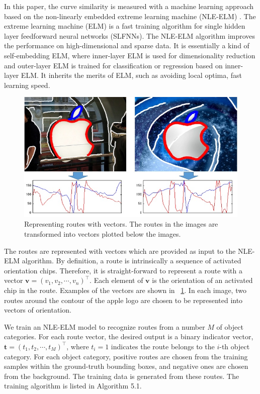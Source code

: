 \documentclass[journal]{IEEEtran}
\begin{document}
In this paper, the curve similarity is measured with a machine learning approach based on 
the non-linearly embedded extreme learning machine (NLE-ELM) \cite{liu2015}.
The extreme learning machine (ELM) \cite{huang2006,tang2015,mohammed2011,huang2014}
is a fast training algorithm for single hidden layer feedforward neural networks (SLFNNs).
The NLE-ELM algorithm improves the performance on high-dimensional and sparse data.
It is essentially a kind of self-embedding ELM, 
where inner-layer ELM is used for dimensionality reduction 
and outer-layer ELM is trained for classification or regression based on inner-layer ELM. 
It inherits the merits of ELM, such as avoiding local optima, fast learning speed. 

\begin{figure}[!t]
\centering
\includegraphics[width=0.9\linewidth]{images/fig12.jpg}
\caption{Representing routes with vectors.
The routes in the images are transformed into vectors plotted below the images.}
\label{fig:12}
\end{figure}

The routes are represented with vectors which are provided as input to the NLE-ELM algorithm.
By definition, a route is intrinsically a sequence of activated orientation chips.
Therefore, it is straight-forward to represent a route with a vector $\mathbf{v}=(v_1,v_2,\cdots,v_n)^\top$.
Each element of $\mathbf{v}$ is the orientation of an activated chip in the route.
Examples of the vectors are shown in \figurename~\ref{fig:12}.
In each image, two routes around the contour of the apple logo are chosen to be represented into vectors of orientation.

We train an NLE-ELM model to recognize routes from a number $M$ of object categories.
For each route vector, the desired output is a binary indicator vector, $\mathbf{t}=(t_1,t_2,\cdots,t_M)^\top$,
where $t_i=1$ indicates the route belongs to the $i$-th object category.  
For each object category, positive routes are chosen from the training samples within the ground-truth bounding boxes,
and negative ones are chosen from the background.
The training data is generated from these routes.
The training algorithm is listed in Algorithm 5.1.
\end{document}
